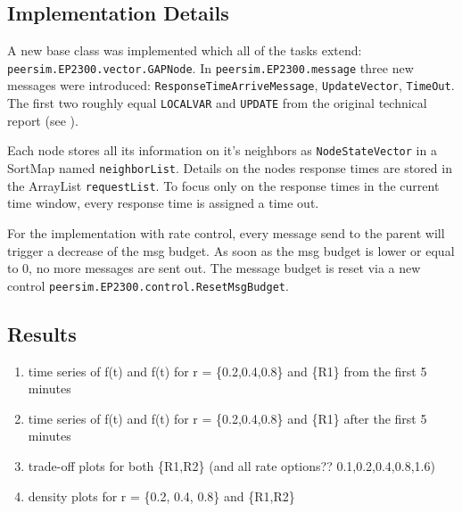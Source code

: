 \documentclass[a4paper, smallheadings,english]{scrartcl}
\begin{document}
\subsection{Implementation Details}
A new base class was implemented which all of the tasks extend: \texttt{peersim.EP2300.vector.GAPNode}. In \texttt{peersim.EP2300.message} three new messages were introduced: \texttt{ResponseTimeArriveMessage}, \texttt{UpdateVector}, \texttt{TimeOut}. The first two roughly equal \texttt{LOCALVAR} and \texttt{UPDATE} from the original technical report (see \cite{stadler2012protocols}).

Each node stores all its information on it's neighbors as \texttt{NodeStateVector} in a SortMap named \texttt{neighborList}. Details on the nodes response times are stored in the ArrayList \texttt{requestList}. To focus only on the response times in the current time window, every response time is assigned a time out.

For the implementation with rate control, every message send to the parent will trigger a decrease of the msg budget. As soon as the msg budget is lower or equal to 0, no more messages are sent out. The message budget is reset via a new control \texttt{peersim.EP2300.control.ResetMsgBudget}.
\subsection{Results}
\begin{enumerate}
    \item time series of f(t) and f(t) for r = \{0.2,0.4,0.8\} and \{R1\} from the first 5 minutes
    \item time series of f(t) and f(t) for r = \{0.2,0.4,0.8\} and \{R1\} after the first 5 minutes
    \item trade-off plots for both \{R1,R2\} (and all rate options?? 0.1,0.2,0.4,0.8,1.6)
    \item density plots for r = \{0.2, 0.4, 0.8\} and \{R1,R2\}
\end{enumerate}
\end{document}
